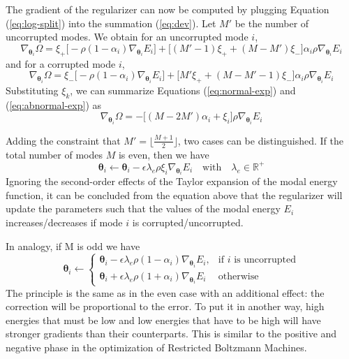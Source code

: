 The gradient of the regularizer can now be computed by plugging Equation (\ref{eq:log-split}) into the summation (\ref{eq:dev}). Let $M'$ be the number of uncorrupted modes. We obtain for an uncorrupted mode $i$,
\begin{equation}
\nabla_{\bm{\theta}_i}\Omega = \xi_+\big[ -\rho(1-\alpha_i)\nabla_{\bm{\theta}_i}E_i \big] + \big[(M'-1)\xi_+ + (M-M')\xi_-\big]\alpha_i\rho\nabla_{\bm{\theta}_i}E_i
\label{eq:normal-exp}
\end{equation}
and for a corrupted mode $i$,
\begin{equation}
\nabla_{\bm{\theta}_i}\Omega =\xi_-\big[ -\rho(1-\alpha_i)\nabla_{\bm{\theta}_i}E_i \big] + \big[M'\xi_+ + (M-M'-1)\xi_-\big]\alpha_i\rho\nabla_{\bm{\theta}_i}E_i
\label{eq:abnormal-exp}
\end{equation}
Substituting $\xi_k$, we can summarize Equations (\ref{eq:normal-exp}) and (\ref{eq:abnormal-exp}) as
\begin{equation}
\boxed{\nabla_{\bm{\theta}_i}\Omega = -\big[(M-2M')\alpha_i + \xi_i\big]\rho\nabla_{\bm{\theta}_i}E_i}
\end{equation}


Adding the constraint that $M' = \lfloor \frac{M+1}{2} \rfloor$, two cases can be distinguished. If the total number of modes $M$ is even, then we have
\begin{equation}
\bm{\theta}_i \leftarrow \bm{\theta}_i - \epsilon\lambda_e\rho\xi_i\nabla_{\bm{\theta}_i}E_i \quad \text{with} \quad \lambda_e \in \mathbb{R}^+
\end{equation}
Ignoring the second-order effects of the Taylor expansion of the modal energy function, it can be concluded from the equation above that the regularizer will update the parameters such that the values of the modal energy $E_i$ increases/decreases if mode $i$ is corrupted/uncorrupted.

In analogy, if M is odd we have
\begin{equation}
\bm{\theta}_i \leftarrow \begin{cases}
       \bm{\theta}_i - \epsilon\lambda_e\rho(1-\alpha_i)\nabla_{\bm{\theta}_i}E_i, & \text{if $i$ is uncorrupted} \\
       \bm{\theta}_i + \epsilon\lambda_e\rho(1+\alpha_i)\nabla_{\bm{\theta}_i}E_i & \text{otherwise}
    \end{cases}
\end{equation}
The principle is the same as in the even case with an additional effect: the correction will be proportional to the error. To put it in another way, high energies that must be low and low energies that have to be high will have stronger gradients than their counterparts. This is similar to the positive and negative phase in the optimization of Restricted Boltzmann Machines.

